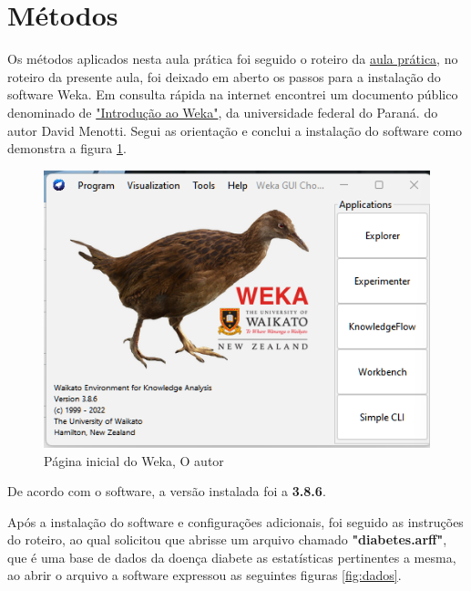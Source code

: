\section{Métodos}
\par Os métodos aplicados nesta aula prática foi seguido o roteiro da \href{https://github.com/OgliariNatan/neuralPerceptron/blob/main/Aula%20pr%C3%A1tica.pdf}{aula prática}, no roteiro da presente aula, foi deixado em aberto os passos para a instalação do software Weka. Em consulta rápida na internet encontrei um documento público denominado de \href{https://github.com/OgliariNatan/neuralPerceptron/blob/main/ML-09weka.pdf}{"Introdução ao Weka"}, da universidade federal do Paraná. do autor David Menotti. Segui as orientação e conclui a instalação do software como demonstra a figura \ref{fig:home_weka}.
\begin{figure}[h]
  \center
  \includegraphics[scale=0.5]{figure/home_weka.png}
  \caption{Página inicial do Weka, O autor}\label{fig:home_weka}
\end{figure}

\begin{center}
    De acordo com o software, a versão instalada foi a \textbf{3.8.6}.
\end{center}


\par Após a instalação do software e configurações adicionais, foi seguido as instruções do roteiro, ao qual solicitou que abrisse um arquivo chamado \textbf{"diabetes.arff"}, que é uma base de dados da doença diabete as estatísticas pertinentes a mesma, ao abrir o arquivo a software expressou as seguintes figuras \ref{fig:dados}.

